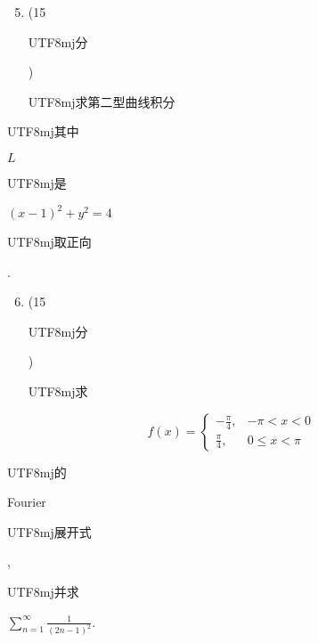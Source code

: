 \documentclass[10pt]{article}
\begin{document}
\begin{enumerate}
  \setcounter{enumi}{4}
  \item (15 \begin{CJK}{UTF8}{mj}分\end{CJK}) \begin{CJK}{UTF8}{mj}求第二型曲线积分\end{CJK}
\end{enumerate}
\begin{CJK}{UTF8}{mj}其中\end{CJK} $L$ \begin{CJK}{UTF8}{mj}是\end{CJK} $(x-1)^{2}+y^{2}=4$ \begin{CJK}{UTF8}{mj}取正向\end{CJK}.

\begin{enumerate}
  \setcounter{enumi}{5}
  \item (15 \begin{CJK}{UTF8}{mj}分\end{CJK}) \begin{CJK}{UTF8}{mj}求\end{CJK}
\end{enumerate}
$$
f(x)= \begin{cases}-\frac{\pi}{4}, & -\pi<x<0 \\ \frac{\pi}{4}, & 0 \leq x<\pi\end{cases}
$$
\begin{CJK}{UTF8}{mj}的\end{CJK} Fourier \begin{CJK}{UTF8}{mj}展开式\end{CJK}, \begin{CJK}{UTF8}{mj}并求\end{CJK} $\sum_{n=1}^{\infty} \frac{1}{(2 n-1)^{2}}$.
\end{document}
